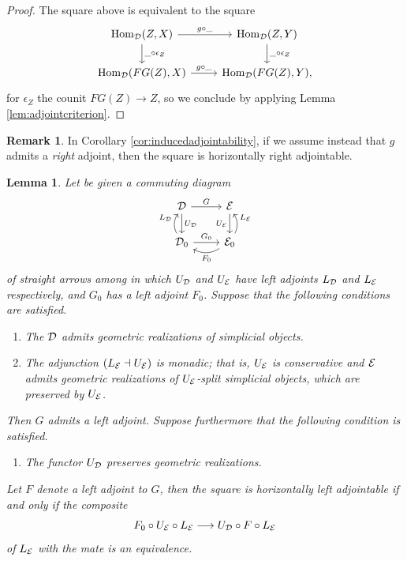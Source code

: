 \documentclass[10pt, reqno, twoside
, final
]{amsart}
\numberwithin{equation}{subsection}%
\theoremstyle{definition}
\theoremstyle{definition}
\theoremstyle{definition}
\theoremstyle{definition}
\theoremstyle{definition}
\theoremstyle{definition}
\theoremstyle{definition}
\theoremstyle{definition}
\theoremstyle{definition}
\theoremstyle{plain}
\theoremstyle{definition}
\theoremstyle{plain}
\theoremstyle{definition}
\theoremstyle{plain}
\theoremstyle{definition}
\newtheorem{rmk}[defn]{Remark}
\theoremstyle{definition}
\theoremstyle{plain}
\newtheorem{lem}[defn]{Lemma}
\theoremstyle{plain}
\theoremstyle{definition}
\theoremstyle{plain}
\theoremstyle{plain}
\theoremstyle{plain}
\begin{document}
\begin{proof}
The square above is equivalent to the square
\[
\begin{tikzcd}
  \Hom_{\icatd}(Z,X) \ar[d,"\_\circ \epsilon_Z"] \ar[r,"g\circ \_"] &   \Hom_{\icatd}(Z,Y) \ar[d,"\_ \circ \epsilon_Z"] \\
  \Hom_{\icatd}(FG(Z),X) \ar[r,"g\circ \_"] &   \Hom_{\icatd}(FG(Z),Y),
\end{tikzcd}
\]
for $\epsilon_Z$ the counit $FG(Z)\rightarrow Z$, so we conclude by applying Lemma \ref{lem:adjointcriterion}.
\end{proof}
\begin{rmk}\label{rmk:flippedinducedadjointability}
In Corollary \ref{cor:inducedadjointability}, if we assume instead that $g$ admits a \emph{right} adjoint, then the square is horizontally right adjointable.
\end{rmk}

\begin{lem}\label{lem:adjointcons}
Let be given a commuting diagram 
\[
\begin{tikzcd}
    \icatd \ar[r,"G"] \ar[d,"U_{\icatd}"] & \icate \ar[d,"U_{\icate}" '] \\
    \icatd_0 \ar[r,"G_0"] \ar[u,"L_{\icatd}" , bend left] & \icate_0 \ar[u,"L_{\icate}" ', bend right] \ar[l,"F_0" , bend left]
\end{tikzcd}
\]
of straight arrows among \infcats in which $U_{\mathcal{D}}$ and $U_{\mathcal{E}}$ have left adjoints $L_{\mathcal{D}}$ and $L_{\mathcal{E}}$ respectively, and $G_0$ has a left adjoint $F_0$. Suppose that the following conditions are satisfied.
\begin{enumerate}[$(1)$]
    \item The \infcat $\mathcal{D}$ admits geometric realizations of simplicial objects.
    \item The adjunction $(L_{\mathcal{E}}\dashv U_{\mathcal{E}})$ is monadic; that is, $U_{\mathcal{E}}$ is conservative and $\mathcal{E}$ admits geometric realizations of $U_{\mathcal{E}}$-split simplicial objects, which are preserved by $U_{\mathcal{E}}$.
\end{enumerate}
Then $G$ admits a left adjoint. Suppose furthermore that the following condition is satisfied.
\begin{enumerate}[$(3)$]
\item The functor $U_{\mathcal{D}}$ preserves geometric realizations. 
\end{enumerate}
Let $F$ denote a left adjoint to $G$, then the square is horizontally left adjointable if and only if the composite 
\[ F_0\circ U_{\mathcal{E}}\circ L_{\mathcal{E}}\longrightarrow U_{\mathcal{D}}\circ F\circ L_{\mathcal{E}} \]
of $L_{\mathcal{E}}$ with the mate is an equivalence.
\end{lem}
\end{document}
